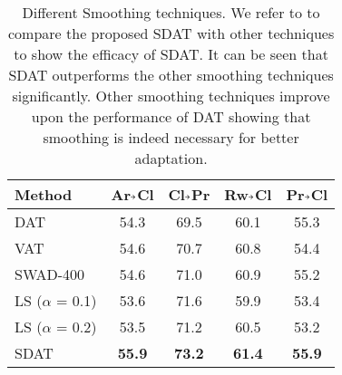 \documentclass[table,dvipsnames]{article}
\newcommand{\veryshortarrow}[1][3pt]{\mathrel{\hbox{\rule[\dimexpr\fontdimen22\textfont2-.2pt\relax]{#1}{.4pt}}\mkern-4mu\hbox{\usefont{U}{lasy}{m}{n}\symbol{41}}}} \newcommand{\cmark}{\ding{51}}\newcommand{\xmark}{\ding{55}}\usepackage{amssymb}\usepackage{pifont}\usepackage[hyphens]{url}
\theoremstyle{plain}
\theoremstyle{definition}
\theoremstyle{remark}
\begin{document}
\begin{table*}[h!]
    \centering
    \caption{Different Smoothing techniques. We refer to \citep{stutz2021relating} to compare the proposed SDAT with other techniques to show the efficacy of SDAT. It can be seen that SDAT outperforms the other smoothing techniques significantly. Other smoothing techniques improve upon the performance of DAT showing that smoothing is indeed necessary for better adaptation.}
    \vskip 0.15in
     \begin{adjustbox}{max width=\columnwidth}
    \begin{tabular}{l|cccc}
    \hline
    {Method} & Ar$\veryshortarrow$Cl &  Cl$\veryshortarrow$Pr & Rw$\veryshortarrow$Cl &  Pr$\veryshortarrow$Cl \\
\hline \hline
    {DAT} & 54.3 & 69.5 & 60.1 & 55.3\\
    
     {VAT} & 54.6 & 70.7 & 60.8 & 54.4 \\
      {SWAD-400} & 54.6 & 71.0 & 60.9 & 55.2 \\
       {LS ($\alpha$ = 0.1)} & 53.6 & 71.6 & 59.9 & 53.4\\
       {LS ($\alpha$ = 0.2)} & 53.5 & 71.2 & 60.5 & 53.2\\
       {SDAT} & \textbf{55.9} & \textbf{73.2} & \textbf{61.4} & \textbf{55.9} \\
    \end{tabular}
    
    \label{tab:diff_smooth_appendix}
    \end{adjustbox}
\end{table*}
\end{document}
